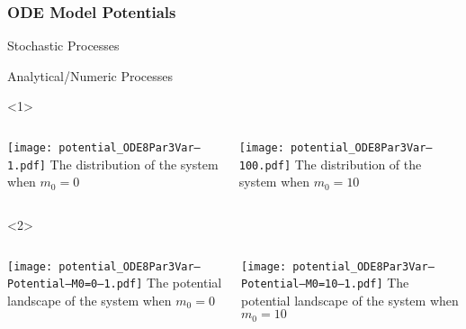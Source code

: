 \documentclass[aspectratio=169, onlytextwidth,  notheorems, sOuRcEs, fleqn, leqno, ]{RUCPresentation}
\begin{document}
\subsubsection{ODE Model Potentials}
\begin{frame}{ Stochastic Processes }


\end{frame}

\begin{frame}{ Analytical/Numeric Processes }

    \begin{onlyenv}<1>

    \begin{columns}
        \column{0.5\framewidth}
                \texttt{[image: potential\_ODE8Par3Var--1.pdf]}
                The distribution of the system when \(m_0 = 0\)


        \column{0.5\framewidth}
                \texttt{[image: potential\_ODE8Par3Var--100.pdf]}
                The distribution of the system when \(m_0 = 10\)

    \end{columns}

    \end{onlyenv}

    \begin{onlyenv}<2>

        \begin{columns}
            \column{0.5\framewidth}
            \texttt{[image: potential\_ODE8Par3Var--Potential--M0=0--1.pdf]}
                The potential landscape of the system when \(m_0 = 0\)


            \column{0.5\framewidth}
            \texttt{[image: potential\_ODE8Par3Var--Potential--M0=10--1.pdf]}
                The potential landscape of the system when \(m_0 = 10\)

        \end{columns}

    \end{onlyenv}

\end{frame}
\end{document}

